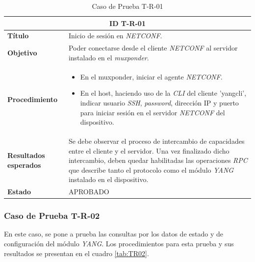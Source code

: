 \begin{table}[H]
\centering
\begin{tabular}{ |m{2.5cm}|m{11cm}|  }
\hline
\multicolumn{2}{|c|}{ \textbf{ID T-R-01} } \\
\hline
\centering
\textbf{Título} & Inicio de sesión en \textit{NETCONF}. \\
\hline
\centering
\textbf{Objetivo} & Poder conectarse desde el cliente \textit{NETCONF} al servidor instalado en el \textit{muxponder}.  \\
\hline
\centering
\textbf{Procedimiento} & \begin{itemize}
  \item En el muxponder, iniciar el agente \textit{NETCONF}.   
  \item En el host, haciendo uso de la \textit{CLI} del cliente 'yangcli', indicar usuario \textit{SSH}, \textit{password}, dirección IP y puerto para iniciar sesión en el servidor \textit{NETCONF} del dispositivo.
\end{itemize}     \\
\hline
\centering
\textbf{Resultados esperados} & 
Se debe observar el proceso de intercambio de capacidades entre el cliente y el servidor. 
Una vez finalizado dicho intercambio, deben quedar habilitadas las operaciones \textit{RPC} que describe tanto el protocolo como el módulo \textit{YANG} instalado en el dispositivo.
  \\

  \hline
\centering
  \textbf{Estado}    & APROBADO  \\
\hline
\end{tabular}

\caption{Caso de Prueba T-R-01}
\label{tab:TR01}
\end{table}



  \subsubsection{Caso de Prueba T-R-02}
  En este caso, se pone a prueba las consultas por los datos de estado y de configuración del módulo \textit{YANG}. Los procedimientos para esta prueba y sus resultados se presentan en el cuadro \ref{tab:TR02}. 

